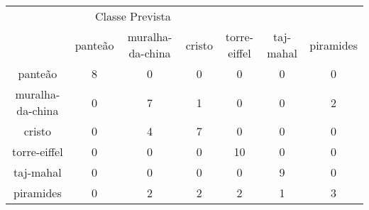 \begin{tabular}{|c|c|c|c|c|c|c|}
\hline
\multicolumn{5}{|c|}{Classe Prevista}\\
 & panteão & muralha-da-china & cristo & torre-eiffel & taj-mahal & piramides\\
panteão & 8 & 0 & 0 & 0 & 0 & 0\\
muralha-da-china & 0 & 7 & 1 & 0 & 0 & 2\\
cristo & 0 & 4 & 7 & 0 & 0 & 0\\
torre-eiffel & 0 & 0 & 0 & 10 & 0 & 0\\
taj-mahal & 0 & 0 & 0 & 0 & 9 & 0\\
piramides & 0 & 2 & 2 & 2 & 1 & 3\\
\end{tabular}
